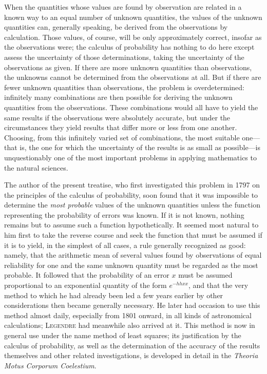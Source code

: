 When the quantities whose values are found by observation are related in a known way to an equal number of unknown quantities, the values of the unknown quantities can, generally speaking, be derived from the observations by calculation. Those values, of course, will be only approximately correct, insofar as the observations were; the calculus of probability has nothing to do here except assess the uncertainty of those determinations, taking the uncertainty of the observations as given. If there are more unknown quantities than observations, the unknowns cannot be determined from the observations at all. But if there are fewer unknown quantities than observations, the problem is overdetermined: infinitely many combinations are then possible for deriving the unknown quantities from the observations. These combinations would all have to yield the same results if the observations were absolutely accurate, but under the circumstances they yield results that differ more or less from one another. Choosing, from this infinitely varied set of combinations, the most suitable one—that is, the one for which the uncertainty of the results is as small as possible—is unquestionably one of the most important problems in applying mathematics to the natural sciences.

The author of the present treatise, who first investigated this problem in 1797 on the principles of the calculus of probability, soon found that it was impossible to determine the \textit{most probable} values of the unknown quantities unless the function representing the probability of errors was known. If it is not known, nothing remains but to assume such a function hypothetically. It seemed most natural to him first to take the reverse course and seek the function that must be assumed if it is to yield, in the simplest of all cases, a rule generally recognized as good: namely, that the arithmetic mean of several values found by observations of equal reliability for one and the same unknown quantity must be regarded as the most probable. It followed that the probability of an error \(x\) must be assumed proportional to an exponential quantity of the form \(e^{-hhxx}\), and that the very method to which he had already been led a few years earlier by other considerations then became generally necessary. He later had occasion to use this method almost daily, especially from 1801 onward, in all kinds of astronomical calculations; \textsc{Legendre} had meanwhile also arrived at it.
This method is now in general use under the name method of least squares; its justification by the calculus of probability, as well as the determination of the accuracy of the results themselves and other related investigations, is developed in detail in the \textit{Theoria Motus Corporum Coelestium}.

